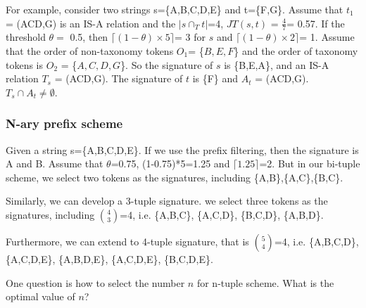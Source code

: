 \smallskip

For example, consider two strings s=\{A,B,C,D,E\} and t=\{F,G\}. Assume that $t_1$ = (ACD,G) is an IS-A relation and the $|s \cap_T t| $=4, $JT(s,t)$ = $\frac{4}{7}$= 0.57.
If the threshold $\theta =$ 0.5, then  $\lceil (1-\theta) \times 5 \rceil$= 3 for $s$ and $\lceil (1-\theta) \times 2 \rceil$= 1. Assume that the order of non-taxonomy tokens $O_1$= \{$B, E, F$\} and the order of taxonomy tokens is $O_2$ = \{$A, C, D, G$\}. So the signature of $s$ is \{B,E,A\}, and an IS-A relation $T_s$ = (ACD,G). The signature of $t$ is \{F\} and $A_t$ = (ACD,G). $ T_s \cap A_t \neq \emptyset$.

%
%
%
%
%
%

\subsubsection{N-ary prefix scheme}

Given a string s=\{A,B,C,D,E\}. If we use the prefix filtering, then the signature is A and B. Assume that $\theta$=0.75, (1-0.75)*5=1.25 and $\lceil 1.25 \rceil$=2. But in our bi-tuple scheme, we select two tokens as the signatures, including \{A,B\},\{A,C\},\{B,C\}.

Similarly, we can develop a 3-tuple signature. we select three tokens as the signatures, including $\binom{4}{3}$=4, i.e. \{A,B,C\}, \{A,C,D\}, \{B,C,D\}, \{A,B,D\}.

Furthermore, we can extend to 4-tuple signature, that is $\binom{5}{4}$=4, i.e. \{A,B,C,D\}, \{A,C,D,E\}, \{A,B,D,E\}, \{A,C,D,E\}, \{B,C,D,E\}.

One question is how to select the number $n$ for n-tuple scheme. What is the optimal value of $n$?

